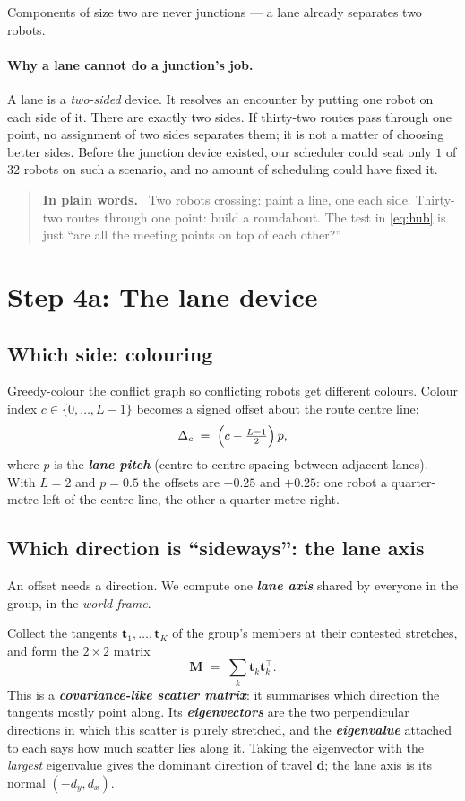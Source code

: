 \documentclass[11pt,a4paper]{article}
\newcommand{\defn}[1]{\textbf{\textit{#1}}}
\newenvironment{keypoint}
  {\begin{quote}\small\noindent\textbf{In plain words.}\ }
  {\end{quote}}
\begin{document}
Components of size two are never junctions --- a lane already separates two robots.

\paragraph{Why a lane cannot do a junction's job.} A lane is a \emph{two-sided} device. It
resolves an encounter by putting one robot on each side of it. There are exactly two sides.
If thirty-two routes pass through one point, no assignment of two sides separates them; it
is not a matter of choosing better sides. Before the junction device existed, our scheduler
could seat only $1$ of $32$ robots on such a scenario, and no amount of scheduling could
have fixed it.

\begin{keypoint}
Two robots crossing: paint a line, one each side. Thirty-two routes through one point:
build a roundabout. The test in \eqref{eq:hub} is just ``are all the meeting points on top
of each other?''
\end{keypoint}

\section{Step 4a: The lane device}
\label{sec:lane}

\subsection{Which side: colouring}

Greedy-colour the conflict graph so conflicting robots get different colours. Colour index
$c \in \{0, \dots, L-1\}$ becomes a signed offset about the route centre line:
\[
\Delta_c \;=\; \Bigl(c - \tfrac{L-1}{2}\Bigr)\, p ,
\]
where $p$ is the \defn{lane pitch} (centre-to-centre spacing between adjacent lanes). With
$L=2$ and $p=0.5$ the offsets are $-0.25$ and $+0.25$: one robot a quarter-metre left of
the centre line, the other a quarter-metre right.

\subsection{Which direction is ``sideways'': the lane axis}

An offset needs a direction. We compute one \defn{lane axis} shared by everyone in the
group, in the \emph{world frame}.

Collect the tangents $\mathbf{t}_1, \dots, \mathbf{t}_K$ of the group's members at their
contested stretches, and form the $2\times2$ matrix
\[
\mathbf{M} \;=\; \sum_{k} \mathbf{t}_k \mathbf{t}_k^{\!\top}.
\]
This is a \defn{covariance-like scatter matrix}: it summarises which direction the tangents
mostly point along. Its \defn{eigenvectors} are the two perpendicular directions in which
this scatter is purely stretched, and the \defn{eigenvalue} attached to each says how much
scatter lies along it. Taking the eigenvector with the \emph{largest} eigenvalue gives the
dominant direction of travel $\mathbf{d}$; the lane axis is its normal $(-d_y, d_x)$.
\end{document}
